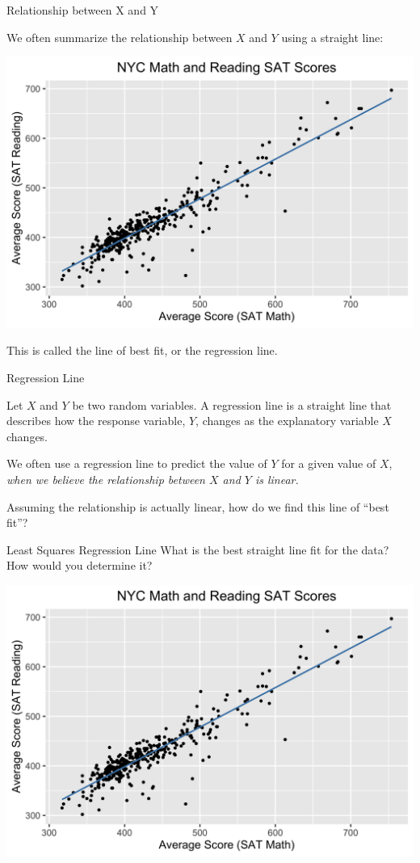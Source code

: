 \documentclass{beamer}
\begin{document}
\begin{frame}{Relationship between X and Y}
	
	We often summarize the relationship between $X$ and $Y$ using a straight line:
	\begin{center}
		\includegraphics[width=.8\textwidth]{reg_line.png}
	\end{center}
	This is called the line of best fit, or the \alert{regression line}.
	
\end{frame}

\begin{frame}{Regression Line}
	\begin{definition}
		Let $X$ and $Y$ be two random variables. A \alert{regression line} is a straight line that describes how the response variable, $Y$, changes as the explanatory variable $X$ changes.
	\end{definition}
	We often use a regression line to predict the value of $Y$ for a given value of $X$, \textit{when we believe the relationship between $X$ and $Y$ is linear.} 
	
	Assuming the relationship is actually linear, how do we find this line of ``best fit''?
\end{frame}
	
\begin{frame}{Least Squares Regression Line}
	What is the best straight line fit for the data? How would you determine it?
	\begin{center}
		\includegraphics[width=.8\textwidth]{reg_line.png}
	\end{center}
\end{frame}
\end{document}

